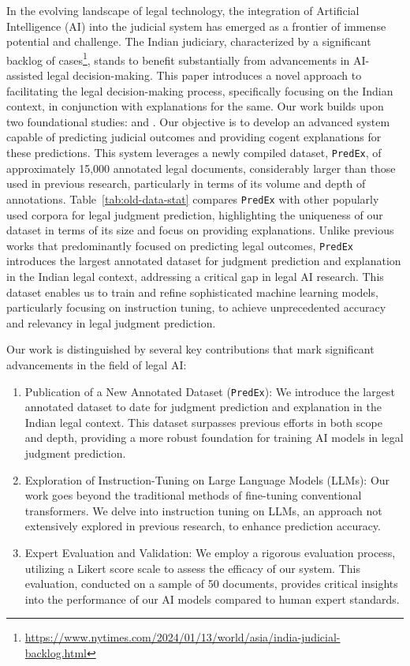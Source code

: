 In the evolving landscape of legal technology, the integration of Artificial Intelligence (AI) into the judicial system has emerged as a frontier of immense potential and challenge. The Indian judiciary, characterized by a significant backlog of cases\footnote{\url{https://www.nytimes.com/2024/01/13/world/asia/india-judicial-backlog.html}}, stands to benefit substantially from advancements in AI-assisted legal decision-making. This paper introduces a novel approach to facilitating the legal decision-making process, specifically focusing on the Indian context, in conjunction with explanations for the same. Our work builds upon two foundational studies: \cite{malik-etal-2021-ildc} and \cite{vats-etal-2023-llms}. Our objective is to develop an advanced system capable of predicting judicial outcomes and providing cogent explanations for these predictions. This system leverages a newly compiled dataset, \texttt{PredEx}, of approximately 15,000 annotated legal documents, considerably larger than those used in previous research, particularly in terms of its volume and depth of annotations. Table~\ref{tab:old-data-stat} compares \texttt{PredEx} with other popularly used corpora for legal judgment prediction, highlighting the uniqueness of our dataset in terms of its size and focus on providing explanations. Unlike previous works that predominantly focused on predicting legal outcomes, \texttt{PredEx} introduces the largest annotated dataset for judgment prediction and explanation in the Indian legal context, addressing a critical gap in legal AI research. This dataset enables us to train and refine sophisticated machine learning models, particularly focusing on instruction tuning, to achieve unprecedented accuracy and relevancy in legal judgment prediction.

Our work is distinguished by several key contributions that mark significant advancements in the field of legal AI:
\begin{enumerate}
    \item Publication of a New Annotated Dataset (\texttt{PredEx}): We introduce the largest annotated dataset to date for judgment prediction and explanation in the Indian legal context. This dataset surpasses previous efforts in both scope and depth, providing a more robust foundation for training AI models in legal judgment prediction.
    
    \item Exploration of Instruction-Tuning on Large Language Models (LLMs): Our work goes beyond the traditional methods of fine-tuning conventional transformers. We delve into instruction tuning on LLMs, an approach not extensively explored in previous research, to enhance prediction accuracy.
    
    \item Expert Evaluation and Validation: We employ a rigorous evaluation process, utilizing a Likert score scale to assess the efficacy of our system. This evaluation, conducted on a sample of 50 documents, provides critical insights into the performance of our AI models compared to human expert standards.
\end{enumerate}

